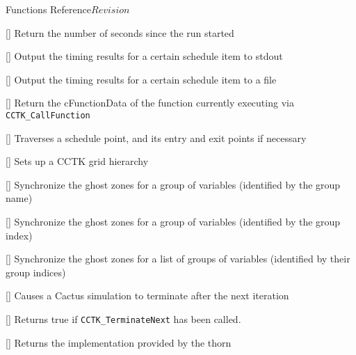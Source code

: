 \begin{cactuspart}{ Functions Reference}{}{$Revision$}
\begin{Lentry}
\item[\code{CCTK\_RunTime}]
  [\pageref{CCTK-RunTime}]
  Return the number of seconds since the run started

\item[\code{CCTK\_SchedulePrintTimes}] [\pageref{CCTK-SchedulePrintTimes}]
  Output the timing results for a certain schedule item to stdout

\item[\code{CCTK\_SchedulePrintTimesToFile}] [\pageref{CCTK-SchedulePrintTimesToFile}]
  Output the timing results for a certain schedule item to a file

\item[\code{CCTK\_ScheduleQueryCurrentFunction}] [\pageref{CCTK-ScheduleQueryCurrentFunction}]
 Return the cFunctionData of the function currently executing via
 \texttt{CCTK\_CallFunction}

\item[\code{CCTK\_ScheduleTraverse}] [\pageref{CCTK-ScheduleTraverse}]
  Traverses a schedule point, and its entry and exit points if necessary

\item[\code{CCTK\_SetupGH}] [\pageref{CCTK-SetupGH}]
  Sets up a CCTK grid hierarchy

\item[\code{CCTK\_SyncGroup}] [\pageref{CCTK-SyncGroup}]
  Synchronize the ghost zones for a group of variables (identified by the group name)

\item[\code{CCTK\_SyncGroupI}] [\pageref{CCTK-SyncGroupI}]
  Synchronize the ghost zones for a group of variables (identified by the group index)

\item[\code{CCTK\_SyncGroupsI}] [\pageref{CCTK-SyncGroupsI}]
  Synchronize the ghost zones for a list of groups of variables (identified by their group indices)

\item[\code{CCTK\_TerminateNext}] [\pageref{CCTK-TerminateNext}]
  Causes a Cactus simulation to terminate after the next iteration

\item[\code{CCTK\_TerminationReached}] [\pageref{CCTK-TerminationReached}]
  Returns true if {\tt CCTK\_TerminateNext} has been called.

\item[\code{CCTK\_ThornImplementation}]
  [\pageref{CCTK-ThornImplementation}]
  Returns the implementation provided by the thorn


\end{Lentry}
\end{cactuspart}
